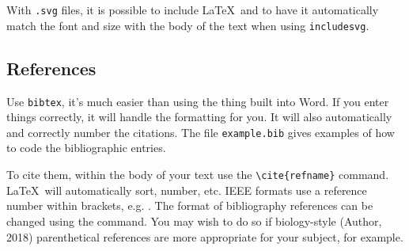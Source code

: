 \documentclass[10pt]{article}
\begin{document}
With \lstinline{.svg} files, it is possible to include \LaTeX\ and to have it automatically match the font and size with the body of the text when using \lstinline{includesvg}. 

\subsection{References}
Use \lstinline{bibtex}, it's much easier than using the thing built into Word. If you enter things correctly, it will handle the formatting for you. It will also automatically and correctly number the citations. The file \lstinline{example.bib} gives examples of how to code the bibliographic entries. 

To cite them, within the body of your text use the \lstinline|\cite{refname}| command. \LaTeX\ will automatically sort, number, etc. IEEE formats use a reference number within brackets, e.g. \cite{young1964synthetic}. The format of bibliography references can be changed using the \lstinline|| command. You may wish to do so if biology-style (Author, 2018) parenthetical references are more appropriate for your subject, for example. 
\end{document}
